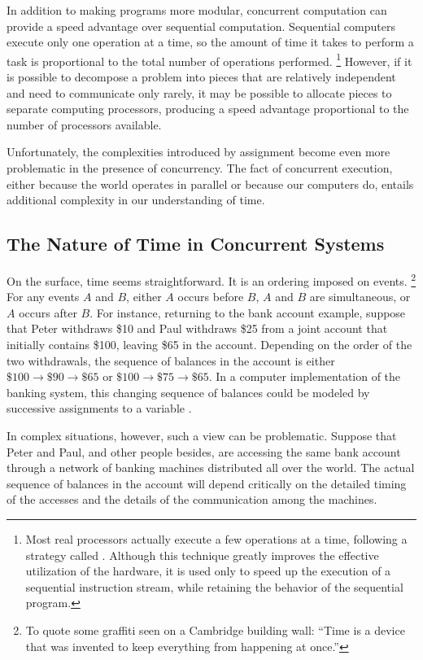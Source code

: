 In addition to making programs more modular, concurrent computation can provide a speed advantage over sequential computation.
Sequential computers execute only one operation at a time, so the amount of time it takes to perform a task is proportional to the total number of operations performed.%
\footnote{
	Most real processors actually execute a few operations at a time, following a strategy called .
	Although this technique greatly improves the effective utilization of the hardware, it is used only to speed up the execution of a sequential instruction stream, while retaining the behavior of the sequential program.
}
However, if it is possible to decompose a problem into pieces that are relatively independent and need to communicate only rarely, it may be possible to allocate pieces to separate computing processors, producing a speed advantage proportional to the number of processors available.

Unfortunately, the complexities introduced by assignment become even more problematic in the presence of concurrency.
The fact of concurrent execution, either because the world operates in parallel or because our computers do, entails additional complexity in our understanding of time.



\subsection{The Nature of Time in Concurrent Systems}
\label{Section 3.4.1}

On the surface, time seems straightforward.
It is an ordering imposed on events.%
\footnote{
	To quote some graffiti seen on a Cambridge building wall:
	“Time is a device that was invented to keep everything from happening at once.”
}
For any events \( A \) and \( B \), either \( A \) occurs before \( B \), \( A \) and \( B \) are simultaneous, or \( A \) occurs after \( B \).
For instance, returning to the bank account example, suppose that Peter withdraws \$10 and Paul withdraws \$25 from a joint account that initially contains \$100, leaving \$65 in the account.
Depending on the order of the two withdrawals, the sequence of balances in the account is either \( \$100 \to \$90 \to \$65 \) or \( \$100 \to \$75 \to \$65 \).
In a computer implementation of the banking system, this changing sequence of balances could be modeled by successive assignments to a variable .

In complex situations, however, such a view can be problematic.
Suppose that Peter and Paul, and other people besides, are accessing the same bank account through a network of banking machines distributed all over the world.
The actual sequence of balances in the account will depend critically on the detailed timing of the accesses and the details of the communication among the machines.

